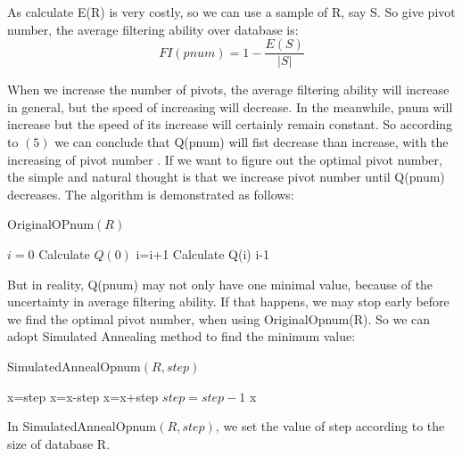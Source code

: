\documentclass{vldb}
\begin{document}
\begin{lem}
As calculate E(R) is very costly, so we can use a sample of R, say S. So give pivot number, the average filtering ability over database is:
\begin{equation}FI(pnum)=1-\frac{E(S)}{|S|}\end{equation}
\end{lem}
When we increase the number of pivots, the average filtering ability will increase in general, but the speed of increasing will decrease.  In the meanwhile,  pnum will increase but the speed of its increase will certainly remain constant. So according to $(5)$ we can conclude that Q(pnum) will fist decrease than increase, with the increasing of pivot number . If we want to figure out the optimal pivot number, the simple and  natural thought is that we increase pivot number until Q(pnum) decreases. The algorithm is demonstrated as follows: 

\begin{algorithm}
	\caption{OriginalOPnum$(R)$}
	\begin{algorithmic}[1]
		\STATE $i=0$	
        \STATE Calculate $Q(0)$                \REPEAT
        \STATE i=i+1
        \STATE Calculate Q(i)
        \RETURN i-1
	\end{algorithmic}
\end{algorithm}
But in reality, Q(pnum) may not only have one minimal value, because of the uncertainty in average filtering ability. If that happens, we may stop early before we find the optimal pivot number, when using OriginalOpnum(R).  So we can adopt Simulated Annealing method to find the minimum value:
\begin{algorithm}
	\caption{SimulatedAnnealOpnum$(R,step)$}
	\begin{algorithmic}[1]
		\STATE x=step	
              \STATE x=x-step
               \ENDIF
               \STATE x=x+step
            \ENDIF
            \STATE $step=step-1$
        \ENDWHILE
        \RETURN x
	\end{algorithmic}
\end{algorithm}

In SimulatedAnnealOpnum$(R,step)$, we set the value of step according to the size of database R. 
\end{document}
